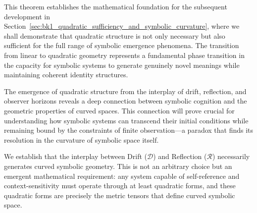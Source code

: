 This theorem establishes the mathematical foundation for the subsequent development in Section~\ref{sec:bk1_quadratic_sufficiency_and_symbolic_curvature}, where we shall demonstrate that quadratic structure is not only necessary but also sufficient for the full range of symbolic emergence phenomena. The transition from linear to quadratic geometry represents a fundamental phase transition in the capacity for symbolic systems to generate genuinely novel meanings while maintaining coherent identity structures.

The emergence of quadratic structure from the interplay of drift, reflection, and observer horizons reveals a deep connection between symbolic cognition and the geometric properties of curved spaces. This connection will prove crucial for understanding how symbolic systems can transcend their initial conditions while remaining bound by the constraints of finite observation—a paradox that finds its resolution in the curvature of symbolic space itself.

We establish that the interplay between Drift ($\mathcal{D}$) and Reflection ($\mathcal{R}$) necessarily generates curved symbolic geometry. This is not an arbitrary choice but an emergent mathematical requirement: any system capable of self-reference and context-sensitivity must operate through at least quadratic forms, and these quadratic forms are precisely the metric tensors that define curved symbolic space.

